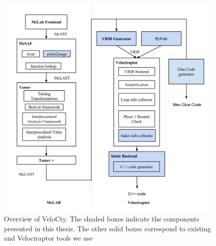 \begin{figure}[htbp]
\begin{center}
\includegraphics[scale=0.5]{Figures/Overview_thesis.png}
\caption[Overview of the VeloCty]{Overview
of VeloCty. The shaded boxes indicate the components
presented in this thesis. The other solid boxes correspond to
existing \mclab and Velociraptor\cite{velociraptor} tools we use}\label{Fig:Overview}
\end{center}
\end{figure}
